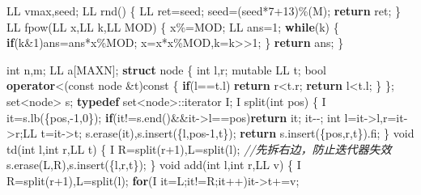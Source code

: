 \documentclass[
]{article}
\newenvironment{Shaded}{}{}
\newcommand{\AttributeTok}[1]{\textcolor[rgb]{0.49,0.56,0.16}{#1}}
\newcommand{\CommentTok}[1]{\textcolor[rgb]{0.38,0.63,0.69}{\textit{#1}}}
\newcommand{\ControlFlowTok}[1]{\textcolor[rgb]{0.00,0.44,0.13}{\textbf{#1}}}
\newcommand{\DataTypeTok}[1]{\textcolor[rgb]{0.56,0.13,0.00}{#1}}
\newcommand{\DecValTok}[1]{\textcolor[rgb]{0.25,0.63,0.44}{#1}}
\newcommand{\KeywordTok}[1]{\textcolor[rgb]{0.00,0.44,0.13}{\textbf{#1}}}
\newcommand{\NormalTok}[1]{#1}
\begin{document}
\begin{Shaded}
\begin{Highlighting}[]
\NormalTok{LL vmax,seed;}
\NormalTok{LL rnd()}
\NormalTok{\{}
\NormalTok{    LL ret=seed;}
\NormalTok{    seed=(seed*}\DecValTok{7}\NormalTok{+}\DecValTok{13}\NormalTok{)\%(M);}
    \ControlFlowTok{return}\NormalTok{ ret;}
\NormalTok{\}}
\NormalTok{LL fpow(LL x,LL k,LL MOD)}
\NormalTok{\{}
\NormalTok{    x\%=MOD; LL ans=}\DecValTok{1}\NormalTok{;}
    \ControlFlowTok{while}\NormalTok{(k)}
\NormalTok{    \{}
        \ControlFlowTok{if}\NormalTok{(k\&}\DecValTok{1}\NormalTok{)ans=ans*x\%MOD;}
\NormalTok{        x=x*x\%MOD,k=k\textgreater{}\textgreater{}}\DecValTok{1}\NormalTok{;}
\NormalTok{    \}}
    \ControlFlowTok{return}\NormalTok{ ans;}
\NormalTok{\}}

\DataTypeTok{int}\NormalTok{ n,m;}
\NormalTok{LL a[MAXN];}
\KeywordTok{struct}\NormalTok{ node}
\NormalTok{\{}
    \DataTypeTok{int}\NormalTok{ l,r;}
    \AttributeTok{mutable}\NormalTok{ LL t;}
    \DataTypeTok{bool} \KeywordTok{operator}\NormalTok{\textless{}(}\AttributeTok{const}\NormalTok{ node \&t)}\AttributeTok{const}
\NormalTok{    \{}
        \ControlFlowTok{if}\NormalTok{(l==t.l) }\ControlFlowTok{return}\NormalTok{ r\textless{}t.r;}
        \ControlFlowTok{return}\NormalTok{ l\textless{}t.l;}
\NormalTok{    \}}
\NormalTok{\};}
\NormalTok{set\textless{}node\textgreater{} s;}
\KeywordTok{typedef}\NormalTok{ set\textless{}node\textgreater{}::iterator I;}
\NormalTok{I split(}\DataTypeTok{int}\NormalTok{ pos)}
\NormalTok{\{}
\NormalTok{    I it=s.lb(\{pos,{-}}\DecValTok{1}\NormalTok{,}\DecValTok{0}\NormalTok{\});}
    \ControlFlowTok{if}\NormalTok{(it!=s.end()\&\&it{-}\textgreater{}l==pos)}\ControlFlowTok{return}\NormalTok{ it;}
\NormalTok{    it{-}{-}; }\DataTypeTok{int}\NormalTok{ l=it{-}\textgreater{}l,r=it{-}\textgreater{}r;LL t=it{-}\textgreater{}t;}
\NormalTok{    s.erase(it),s.insert(\{l,pos{-}}\DecValTok{1}\NormalTok{,t\});}
    \ControlFlowTok{return}\NormalTok{ s.insert(\{pos,r,t\}).fi;}
\NormalTok{\}}
\DataTypeTok{void}\NormalTok{ td(}\DataTypeTok{int}\NormalTok{ l,}\DataTypeTok{int}\NormalTok{ r,LL t)}
\NormalTok{\{}
\NormalTok{    I R=split(r+}\DecValTok{1}\NormalTok{),L=split(l); }\CommentTok{//先拆右边，防止迭代器失效}
\NormalTok{    s.erase(L,R),s.insert(\{l,r,t\});}
\NormalTok{\}}
\DataTypeTok{void}\NormalTok{ add(}\DataTypeTok{int}\NormalTok{ l,}\DataTypeTok{int}\NormalTok{ r,LL v)}
\NormalTok{\{}
\NormalTok{    I R=split(r+}\DecValTok{1}\NormalTok{),L=split(l);}
    \ControlFlowTok{for}\NormalTok{(I it=L;it!=R;it++)it{-}\textgreater{}t+=v;}

\end{Highlighting}
\end{Shaded}
\end{document}
